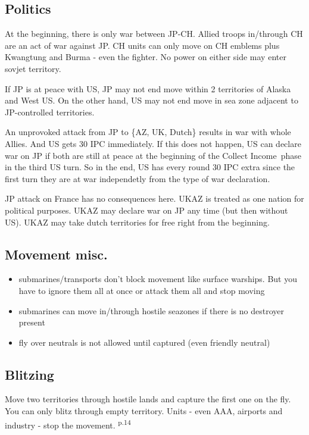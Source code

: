 \documentclass[10pt,twoside]{article}
\begin{document}
\begin{multicols*}{3}
\subsection*{Politics}
At the beginning, there is only war between JP-CH. Allied troops in/through CH are an act of war against JP. CH units can only move on CH emblems plus Kwangtung and Burma - even the fighter. No power on either side may enter sovjet territory.

If JP is at peace with US, JP may not end move within 2 territories of Alaska and West US. On the other hand, US may not end move in sea zone adjacent to JP-controlled territories. 

An unprovoked attack from JP to \{AZ, UK, Dutch\} results in war with whole Allies. And US gets 30 IPC immediately. If this does not happen, US can declare war on JP if both are still at peace at the beginning of the \glqq Collect Income\grqq\ phase in the third US turn. So in the end, US has every round 30 IPC extra since the first turn they are at war independetly from the type of war declaration.

JP attack on France has no consequences here. UKAZ is treated as one nation for political purposes. UKAZ may declare war on JP any time (but then without US).
UKAZ may take dutch territories for free right from the beginning.

\subsection*{Movement misc.}
\begin{itemize}
\item submarines/transports don't block movement like surface warships. But you have to ignore them all at once or attack them all and stop moving
\item submarines can move in/through hostile seazones if there is no destroyer present
\item fly over neutrals is not allowed until captured (even friendly neutral)
\end{itemize}

\subsection*{Blitzing}
Move two territories through hostile lands and capture the first one on the fly. You can only blitz through empty territory. Units - even AAA, airports and industry - stop the movement. \textsuperscript{p.14}


\end{multicols*}
\end{document}
